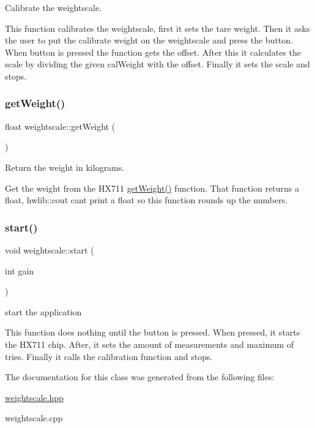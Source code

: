 Calibrate the weightscale. 

This function calibrates the weightscale, first it sets the tare weight. Then it asks the user to put the calibrate weight on the weightscale and press the button. When button is pressed the function gets the offset. After this it calculates the scale by dividing the given cal\+Weight with the offset. Finally it sets the scale and stops. \mbox{\label{classweightscale_a8ca1a617d9b677088fb45b8b621c6570}} 
\subsubsection{\texorpdfstring{get\+Weight()}{getWeight()}}
{\footnotesize\ttfamily float weightscale\+::get\+Weight (\begin{DoxyParamCaption}{ }\end{DoxyParamCaption})\hspace{0.3cm}{\ttfamily [override]}}



Return the weight in kilograms. 

Get the weight from the H\+X711 \hyperlink{classweightscale_a8ca1a617d9b677088fb45b8b621c6570}{get\+Weight()} function. That function returns a float, hwlib\+::cout can\textquotesingle{}t print a float so this function rounds up the numbers. \mbox{\label{classweightscale_a1ba11d72b8488af4b25228ff21561dc7}} 
\subsubsection{\texorpdfstring{start()}{start()}}
{\footnotesize\ttfamily void weightscale\+::start (\begin{DoxyParamCaption}\item[{int}]{gain }\end{DoxyParamCaption})\hspace{0.3cm}{\ttfamily [override]}}



start the application 

This function does nothing until the button is pressed. When pressed, it starts the H\+X711 chip. After, it sets the amount of measurements and maximum of tries. Finally it calls the calibration function and stops. 

The documentation for this class was generated from the following files\+:\begin{DoxyCompactItemize}
\item 
\hyperlink{weightscale_8hpp}{weightscale.\+hpp}\item 
weightscale.\+cpp\end{DoxyCompactItemize}

